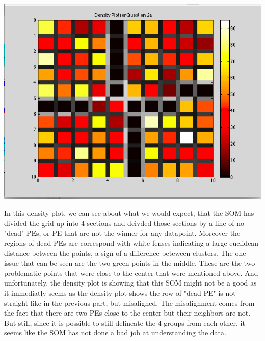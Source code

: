 \documentclass[epsfig]{article}
\begin{document}
\begin{center}
\includegraphics[scale=0.6]{pic6}
\end{center}
In this density plot, we can see about what we would expect, that the SOM has divided the grid up into 4 sections and deivded those sections by a line of no "dead" PEs, or PE that are not the winner for any datapoint. Moreover the regions of dead PEs are correspond with white fenses indicating a large euclidean distance between the points, a sign of a difference beteween clusters. The one issue that can be seen are the two green points in the middle. These are the two problematic points that were close to the center that were mentioned above. And unfortunately, the density plot is showing that this SOM might not be a good as it immediatly seems as the density plot shows the row of "dead PE" is not straight like in the previous part, but misaligned. The misalignment comes from the fact that there are two PEs close to the center but their neighbors are not. But still, since it is possible to still delineate the 4 groups from each other, it seems like the SOM has not done a bad job at understanding the data.
\newpage
\end{document}
